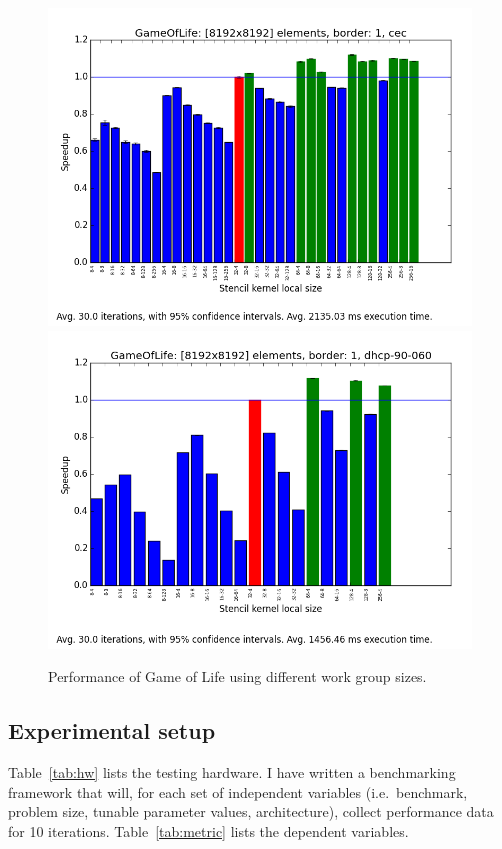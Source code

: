 \begin{figure}[h]
\includegraphics[width=\textwidth]{img/GameOfLife-00008192-01-cec.png}
\includegraphics[width=\textwidth]{img/GameOfLife-00008192-01-dhcp-90-060.png}
\caption{Performance of Game of Life using different work group
  sizes.}
\label{fig:gol}
\end{figure}

\subsection{Experimental setup}

Table~\ref{tab:hw} lists the testing hardware. I have written a
benchmarking framework that will, for each set of independent
variables (i.e.\ benchmark, problem size, tunable parameter values,
architecture), collect performance data for 10
iterations. Table~\ref{tab:metric} lists the dependent variables.

